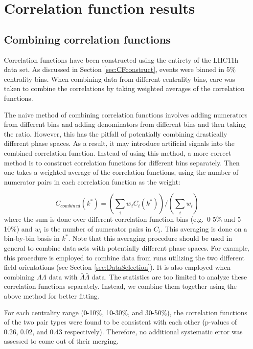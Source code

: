 \section{Correlation function results}
\label{sec:CorrelationFunctionResults}
\subsection{Combining correlation functions}
\label{sec:CFCombining}

Correlation functions have been constructed using the entirety of the LHC11h data set.  
As discussed in Section \ref{sec:CFconstruct}, events were binned in 5\% centrality bins.  
When combining data from different centrality bins, care was taken to combine the correlations by taking weighted averages of the correlation functions.  

The naive method of combining correlation functions involves adding numerators from different bins and adding denominators from different bins and then taking the ratio.  
However, this has the pitfall of potentially combining drastically different phase spaces.  
As a result, it may introduce artificial signals into the combined correlation function.  
Instead of using this method, a more correct method is to construct correlation functions for different bins separately.  
Then one takes a weighted average of the correlation functions, using the number of numerator pairs in each correlation function as the weight:

\begin{equation}
\label{eq:CombineCF}
C_{combined}(k^*) = (\displaystyle\sum\limits_{i} w_i C_i(k^*))/(\displaystyle\sum\limits_{i} w_i)
\end{equation}
where the sum is done over different correlation function bins (e.g.\ 0-5\% and 5-10\%) and $w_i$ is the number of numerator pairs in $C_i$.  
This averaging is done on a bin-by-bin basis in $k^*$.  
Note that this averaging procedure should be used in general to combine data sets with potentially different phase spaces. 
For example, this procedure is employed to combine data from runs utilizing the two different field orientations (see Section \ref{sec:DataSelection}).  
It is also employed when combining $\Lambda\Lambda$ data with $\bar{\Lambda}\bar{\Lambda}$ data.  
The statistics are too limited to analyze these correlation functions separately. Instead, we combine them together using the above method for better fitting.

For each centrality range (0-10\%, 10-30\%, and 30-50\%), the correlation functions of the two pair types were found to be consistent with each other (p-values of 0.26, 0.02, and 0.43 respectively).  
Therefore, no additional systematic error was assessed to come out of their merging.

